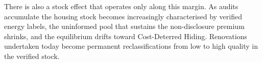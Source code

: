 There is also a stock effect that operates only along this margin. As audits accumulate the housing stock becomes increasingly characterised by verified energy labels, the uninformed pool that sustains the non-disclosure premium shrinks, and the equilibrium drifts toward Cost-Deterred Hiding. Renovations undertaken today become permanent reclassifications from low to high quality in the verified stock.
